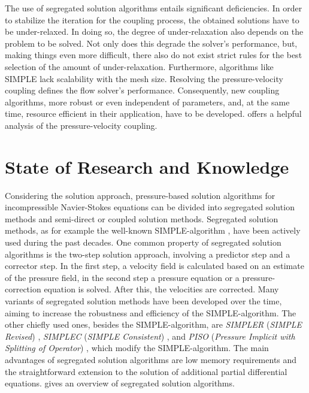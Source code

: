 The use of segregated solution algorithms entails significant deficiencies. In order to stabilize the iteration for the coupling process, the obtained solutions have to be under-relaxed. In doing so, the degree of under-relaxation also depends on the problem to be solved. Not only does this degrade the solver's performance, but, making things even more difficult, there also do not exist strict rules for the best selection of the amount of under-relaxation. Furthermore, algorithms like SIMPLE lack scalability with the mesh size. Resolving the pressure-velocity coupling defines the flow solver's performance. Consequently, new coupling algorithms, more robust or even independent of parameters, and, at the same time, resource efficient in their application, have to be developed. \cite{peric90} offers a helpful analysis of the pressure-velocity coupling.

\section{State of Research and Knowledge}

Considering the solution approach, pressure-based solution algorithms for incompressible Navier-Stokes equations can be divided into segregated solution methods and semi-direct or coupled solution methods. Segregated solution methods, as for example the well-known SIMPLE-algorithm \cite{patankar72}, have been actively used during the past decades. One common property of segregated solution algorithms is the two-step solution approach, involving a predictor step and a corrector step. In the first step, a velocity field is calculated based on an estimate of the pressure field, in the second step a pressure equation or a pressure-correction equation is solved. After this, the velocities are corrected. Many variants of segregated solution methods have been developed over the time, aiming to increase the robustness and efficiency of the SIMPLE-algorithm. The other chiefly used ones, besides the SIMPLE-algorithm, are \emph{SIMPLER} (\emph{SIMPLE Revised}) \cite{patankar80}, \emph{SIMPLEC} (\emph{SIMPLE Consistent}) \cite{doormaal84}, and \emph{PISO} (\emph{Pressure Implicit with Splitting of Operator}) \cite{issa86}, which modify the SIMPLE-algorithm. The main advantages of segregated solution algorithms are low memory requirements and the straightforward extension to the solution of additional partial differential equations.\cite{darwish00} gives an overview of segregated solution algorithms.

